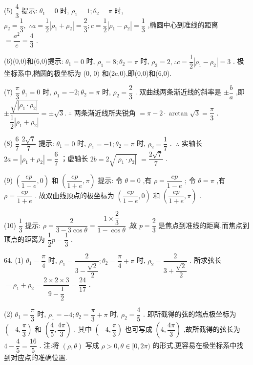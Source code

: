 (5) $\dfrac{4}{3}$ 提示: ${\theta }_{1} = 0$ 时, ${\rho }_{1} = 1;{\theta }_{2} = \pi$ 时, ${\rho }_{2} = \dfrac{1}{3},\;\therefore a = \dfrac{1}{2}\left| {{\rho }_{1} + {\rho }_{2}}\right|  = \dfrac{2}{3};c = \dfrac{1}{2}\left| {{\rho }_{1} - {\rho }_{2}}\right|  = \dfrac{1}{3}$ ,椭圆中心到准线的距离 $= \dfrac{{a}^{2}}{c} = \dfrac{4}{3}$ .

(6)(0,0)和(6,0)提示: ${\theta }_{1} = 0$ 时, ${\rho }_{1} = 8;{\theta }_{2} = \pi$ 时, ${\rho }_{2} = 2,\therefore c = \dfrac{1}{2}\left| {{\rho }_{1} - {\rho }_{2}}\right|  = 3$ . 极坐标系中,椭圆的极坐标为 (0, $0)$ 和(2c,0),即(0,0)和(6,0).

(7) $\dfrac{\pi }{3}\;{\theta }_{1} = 0$ 时, ${\rho }_{1} =  - 2;{\theta }_{2} = \pi$ 时, ${\rho }_{2} = \dfrac{2}{3}$ . 双曲线两条渐近线的斜率是 $\pm  \dfrac{b}{a}$ ,即 $\pm  \dfrac{\sqrt{\left| {\rho }_{1} \cdot  {\rho }_{2}\right| }}{\dfrac{1}{2}\left| {{\rho }_{1} + {\rho }_{2}}\right| } =  \pm  \sqrt{3}.\;\therefore$ 两条渐近线所夹锐角 $= \pi  - 2 \cdot  \arctan \sqrt{3} = \dfrac{\pi }{3}$ .

(8) $\dfrac{6}{7}\;\dfrac{2\sqrt{7}}{7}$ 提示: ${\theta }_{1} = 0$ 时, ${\rho }_{1} =  - 1;{\theta }_{2} = \pi$ 时, ${\rho }_{2} = \dfrac{1}{7}$ . $\;\therefore$ 实轴长 ${2a} = \left| {{\rho }_{1} + {\rho }_{2}}\right|  = \dfrac{6}{7}$ ；虚轴长 ${2b} = 2\sqrt{\left| {\rho }_{1} \cdot  {\rho }_{2}\right| }$  $= \dfrac{2\sqrt{7}}{7}$ .

(9) $\left( {\dfrac{ep}{1 - e},0}\right)$ 和 $\left( {\dfrac{ep}{1 + e},\pi }\right)$ 提示: 令 $\theta  = 0$ ,有 $\rho  = \dfrac{ep}{1 - e}$ ; 令 $\theta  = \pi$ ,有 $\rho  = \dfrac{ep}{1 + e}$ . 故双曲线顶点的极坐标为 $\left( {\dfrac{ep}{1 - e},0}\right)$ 和 $\left( {\dfrac{ep}{1 + e},\pi }\right)$ .

(10) $\dfrac{1}{3}$ 提示: $\rho  = \dfrac{2}{3 - 3\cos \theta } = \dfrac{1 \times  \dfrac{2}{3}}{1 - \cos \theta }$ ,故 $p = \dfrac{2}{3}$ 是焦点到准线的距离,而焦点到顶点的距离为 $\dfrac{1}{2}p = \dfrac{1}{3}$ .

64. (1) ${\theta }_{1} = \dfrac{\pi }{4}$ 时, ${\rho }_{1} = \dfrac{2}{3 - \dfrac{\sqrt{2}}{2}};{\theta }_{2} = \dfrac{\pi }{4} + \pi$ 时, ${\rho }_{2} = \dfrac{2}{3 + \dfrac{\sqrt{2}}{2}}$ . 所求弦长 $= {\rho }_{1} + {\rho }_{2} = \dfrac{2 \times  2 \times  3}{9 - \dfrac{1}{2}} = \dfrac{24}{17}$ .

(2) ${\theta }_{1} = \dfrac{\pi }{3}$ 时, ${\rho }_{1} =  - 4;{\theta }_{2} = \dfrac{\pi }{3} + \pi$ 时, ${\rho }_{2} = \dfrac{4}{5}$ . 即所截得的弦的端点极坐标为 $\left( {-4,\dfrac{\pi }{3}}\right)$ 和 $\left( {\dfrac{4}{5},\dfrac{4\pi }{3}}\right)$ . 其中 $\left( {-4,\dfrac{\pi }{3}}\right)$ 也可写成 $\left( {4,\dfrac{4\pi }{3}}\right)$ ,故所截得的弦长为 $4 - \dfrac{4}{5} = \dfrac{16}{5}$ . 注:将 $\left( {\rho ,\theta }\right)$ 写成 $\rho  > 0,\theta  \in  \lbrack 0,{2\pi })$ 的形式,更容易在极坐标系中找到对应点的准确位置.

